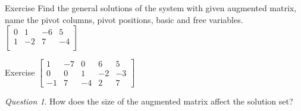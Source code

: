 \documentclass{beamer}
\theoremstyle{definition}
\theoremstyle{remark}
\newtheorem*{question}{Question}
\begin{document}
\begin{frame}[t]{Exercise}
Find the general solutions of the system with given augmented matrix, name the pivot columns, pivot positions, basic and free variables.
\pause
\newline\newline\newline
$\begin{bmatrix}
0&1&-6&5\\
1&-2&7&-4\\
\end{bmatrix}$
\end{frame}

\begin{frame}[t]{Exercise}
$\begin{bmatrix}
1&-7&0&6&5\\
0&0&1&-2&-3\\
-1&7&-4&2&7
\end{bmatrix}$
\end{frame}

\begin{frame}[t]
\begin{question}
How does the size of the augmented matrix affect the solution set?
\end{question}
\end{frame}
\end{document}
